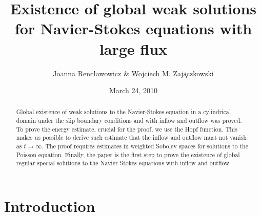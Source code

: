 \documentclass{amsart}
\title[Large flux for NSE]{Existence of global weak solutions {\hfil\break} for Navier-Stokes equations with large flux}
\author[J. Renc{\l}awowicz \& W. M.
Zaj\c{a}czkowski]{Joanna Renc{\l}awowicz \& Wojciech M.
Zaj\c{a}czkowski}
\date{March 24, 2010}
\theoremstyle{plain}
\begin{document}
\begin{abstract}
Global existence of weak solutions to the Navier-Stokes equation
in a cylindrical domain under the slip boundary conditions and
with inflow and outflow was proved. To prove the energy estimate,
crucial for the proof, we use the Hopf function. This makes us
possible to derive such estimate that the inflow and outflow must
not vanish as $t{\rightarrow}\infty.$ The proof requires estimates in
weighted Sobolev spaces for solutions to the Poisson equation.
Finally, the paper is the first step to prove the existence of
global regular special solutions to the Navier-Stokes equations
with inflow and outflow.
\end{abstract}



\maketitle

\section{Introduction}
\end{document}
